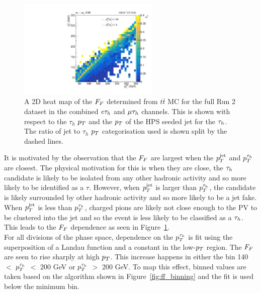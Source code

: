 \begin{figure}[!hbtp]
\centering
    \includegraphics[width=0.6\textwidth]{Figures/ff_colz_ttbar_lt_v2.pdf}
\caption[Plot of the reliance of the fake factors on the ratio of the $\tauh$ and jet $\pT$.]{A 2D heat map of the $F_{F}$ determined from $t\bar{t}$ MC for the full Run 2 dataset in the combined $e\tau_{h}$ and $\mu\tau_{h}$ channels. This is shown with respect to the $\tau_h$ $\pT$ and the $\pT$ of the HPS seeded jet for the $\tauh$. The ratio of jet to $\tau_h$ $\pT$ categorisation used is shown split by the dashed lines.}
\label{fig:ff_colz}
\end{figure}

It is motivated by the observation that the $F_{F}$ are largest when the $p_{T}^{\text{jet}}$ and $p_{T}^{\tau_{h}}$ are closest.
The physical motivation for this is when they are close, the $\tauh$ candidate is likely to be isolated from any other hadronic activity and so more likely to be identified as a $\tau$.
However, when $p_{T}^{\text{jet}}$ is larger than $p_{T}^{\tau_{h}}$, the candidate is likely surrounded by other hadronic activity and so more likely to be a jet fake.
When $p_{T}^{\text{jet}}$ is less than $p_{T}^{\tau_{h}}$, charged pions are likely not close enough to the \ac{PV} to be clustered into the jet and so the event is less likely to be classified as a $\tauh$. 
This leads to the $F_{F}$ dependence as seen in Figure~\ref{fig:ff_colz}.\\

For all divisions of the phase space, dependence on the $p_{T}^{\tau_{h}}$ is fit using the superposition of a Landau function and a constant in the low-$\pT$ region.
The $F_{F}$ are seen to rise sharply at high $\pT$.
This increase happens in either the bin 140 $<$ $p_{T}^{\tau_{h}}$ $<$ 200 GeV or $p_{T}^{\tau_{h}}$ $>$ 200 GeV.
To map this effect, binned values are taken based on the algorithm shown in Figure~\ref{fig:ff_binning} and the fit is used below the minimum bin.

